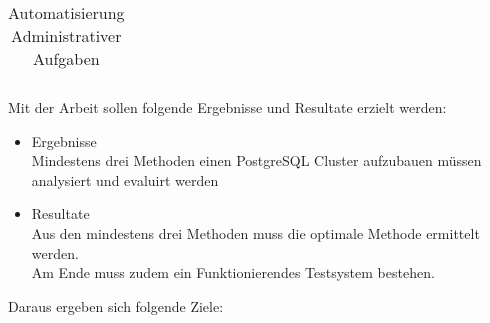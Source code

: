 \begin{flushleft}
\begin{table}[H]
{\begin{tabular}{@{}lllllll@{}}
\end{tabular}%
}
\caption{Automatisierung Administrativer Aufgaben}
\label{tab:automatgisierung_administrative_aufgaben}
\end{table}
\begin{flushleft}
Mit der Arbeit sollen folgende Ergebnisse und Resultate erzielt werden:
\begin{itemize}
    \item Ergebnisse \\ Mindestens drei Methoden einen \Gls{PostgreSQL Cluster} aufzubauen müssen analysiert und evaluirt werden
    \item Resultate \\ Aus den mindestens drei Methoden muss die optimale Methode ermittelt werden. \\ Am Ende muss zudem ein Funktionierendes Testsystem bestehen.
\end{itemize}
\end{flushleft}
\begin{flushleft}
Daraus ergeben sich folgende Ziele:
\end{flushleft}
\begin{table}[H]
\end{table}
\end{flushleft}
